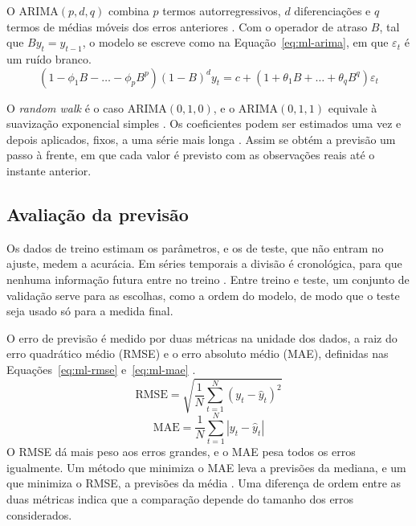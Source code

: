 O ARIMA$(p,d,q)$ combina $p$ termos autorregressivos, $d$ diferenciações e $q$
termos de médias móveis dos erros anteriores \cite{box2015, hyndman2021}. Com o
operador de atraso $B$, tal que $B y_t = y_{t-1}$, o modelo se escreve como na
Equação~\ref{eq:ml-arima}, em que $\varepsilon_t$ é um ruído branco.
\begin{equation}
	\left(1 - \phi_1 B - \dots - \phi_p B^p\right)(1-B)^d y_t = c + \left(1 + \theta_1 B + \dots + \theta_q B^q\right)\varepsilon_t
	\label{eq:ml-arima}
\end{equation}

O \textit{random walk} é o caso ARIMA$(0,1,0)$, e o ARIMA$(0,1,1)$ equivale à
suavização exponencial simples \cite{hyndman2021}. Os coeficientes podem ser
estimados uma vez e depois aplicados, fixos, a uma série mais longa
\cite{statsmodelsapply}. Assim se obtém a previsão um passo à frente, em que
cada valor é previsto com as observações reais até o instante anterior.

\subsection{Avaliação da previsão}
\label{subsec:ml-avaliacao}

Os dados de treino estimam os parâmetros, e os de teste, que não entram no
ajuste, medem a acurácia. Em séries temporais a divisão é cronológica, para que
nenhuma informação futura entre no treino \cite{hyndman2021, bergmeir2012}.
Entre treino e teste, um conjunto de validação serve para as escolhas, como a
ordem do modelo, de modo que o teste seja usado só para a medida final.

O erro de previsão é medido por duas métricas na unidade dos dados, a raiz do
erro quadrático médio (RMSE) e o erro absoluto médio (MAE), definidas nas
Equações~\ref{eq:ml-rmse} e~\ref{eq:ml-mae} \cite{hyndman2021}.
\begin{equation}
	\mathrm{RMSE} = \sqrt{\frac{1}{N}\sum_{t=1}^{N}\left(y_t - \hat{y}_t\right)^2}
	\label{eq:ml-rmse}
\end{equation}
\begin{equation}
	\mathrm{MAE} = \frac{1}{N}\sum_{t=1}^{N}\left|y_t - \hat{y}_t\right|
	\label{eq:ml-mae}
\end{equation}
O RMSE dá mais peso aos erros grandes, e o MAE pesa todos os erros igualmente.
Um método que minimiza o MAE leva a previsões da mediana, e um que minimiza o
RMSE, a previsões da média \cite{hyndman2021}. Uma diferença de ordem entre as
duas métricas indica que a comparação depende do tamanho dos erros
considerados.

